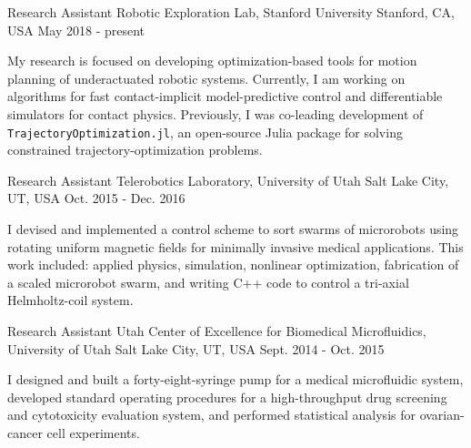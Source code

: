 

\begin{cventries}

  \cventry
    {Research Assistant} %
    {Robotic Exploration Lab, Stanford University} %
    {Stanford, CA, USA} %
    {May 2018 - present} %
    {
      \begin{cvitems} %
      My research is focused on developing optimization-based tools for motion planning of underactuated robotic systems. Currently, I am working on algorithms for fast contact-implicit model-predictive control and differentiable simulators for contact physics. Previously, I was co-leading development of \texttt{TrajectoryOptimization.jl}, an open-source Julia package for solving constrained trajectory-optimization problems.
      \end{cvitems}
    }
    
  \cventry
    {Research Assistant} %
    {Telerobotics Laboratory, University of Utah} %
    {Salt Lake City, UT, USA} %
    {Oct. 2015 - Dec. 2016} %
    {
      \begin{cvitems} %
      I devised and implemented a control scheme to sort swarms of microrobots using rotating uniform magnetic fields for minimally invasive medical applications. This work included: applied physics, simulation, nonlinear optimization, fabrication of a scaled microrobot swarm, and writing C++ code to control a tri-axial Helmholtz-coil system.
      \end{cvitems}
    }
    
  \cventry
    {Research Assistant} %
    {Utah Center of Excellence for Biomedical Microfluidics, University of Utah} %
    {Salt Lake City, UT, USA} %
    {Sept. 2014 - Oct. 2015} %
    {
      \begin{cvitems} %
      I designed and built a forty-eight-syringe pump for a medical microfluidic system, developed standard operating procedures for a high-throughput drug screening and cytotoxicity evaluation system, and performed statistical analysis for ovarian-cancer cell experiments.
      \end{cvitems}
    }

\end{cventries}
